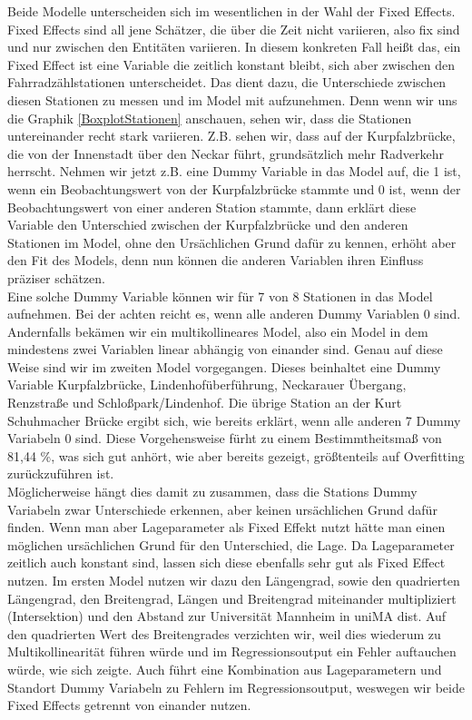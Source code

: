 \documentclass[a4paper,12pt]{thesis}
\begin{document}
Beide Modelle unterscheiden sich im wesentlichen in der Wahl der Fixed Effects. Fixed Effects sind all jene Schätzer, die über die Zeit nicht variieren, also fix sind und nur zwischen den Entitäten variieren. In diesem konkreten Fall heißt das, ein Fixed Effect ist eine Variable die zeitlich konstant bleibt, sich aber zwischen den Fahrradzählstationen unterscheidet. Das dient dazu, die Unterschiede zwischen diesen Stationen zu messen und im Model mit aufzunehmen. Denn wenn wir uns die Graphik \ref{BoxplotStationen} anschauen, sehen wir, dass die Stationen untereinander recht stark variieren. Z.B. sehen wir, dass auf der Kurpfalzbrücke, die von der Innenstadt über den Neckar führt, grundsätzlich mehr Radverkehr herrscht. Nehmen wir jetzt z.B. eine Dummy Variable in das Model auf, die 1 ist, wenn ein Beobachtungswert von der Kurpfalzbrücke stammte und 0 ist, wenn der Beobachtungswert von einer anderen Station stammte, dann erklärt diese Variable den Unterschied zwischen der Kurpfalzbrücke und den anderen Stationen im Model, ohne den Ursächlichen Grund dafür zu kennen, erhöht aber den Fit des Models, denn nun können die anderen Variablen ihren Einfluss präziser schätzen.\\ 

Eine solche Dummy Variable können wir für 7 von 8 Stationen in das Model aufnehmen. Bei der achten reicht es, wenn alle anderen Dummy Variablen 0 sind. Andernfalls bekämen wir ein multikollineares Model, also ein Model in dem mindestens zwei Variablen linear abhängig von einander sind. Genau auf diese Weise sind wir im zweiten Model vorgegangen. Dieses beinhaltet eine Dummy Variable Kurpfalzbrücke, Lindenhofüberführung, Neckarauer Übergang, Renzstraße und Schloßpark/Lindenhof. Die übrige Station an der Kurt Schuhmacher Brücke ergibt sich, wie bereits erklärt, wenn alle anderen 7 Dummy Variabeln 0 sind. Diese Vorgehensweise fürht zu einem Bestimmtheitsmaß von 81,44 \%, was sich gut anhört, wie aber bereits gezeigt, größtenteils auf Overfitting zurückzuführen ist.\\

Möglicherweise hängt dies damit zu zusammen, dass die Stations Dummy Variabeln zwar Unterschiede erkennen, aber keinen ursächlichen Grund dafür finden. Wenn man aber Lageparameter als Fixed Effekt nutzt hätte man einen möglichen ursächlichen Grund für den Unterschied, die Lage. Da Lageparameter zeitlich auch konstant sind, lassen sich diese ebenfalls sehr gut als Fixed Effect nutzen. Im ersten Model nutzen wir dazu den Längengrad, sowie den quadrierten Längengrad, den Breitengrad, Längen und Breitengrad miteinander multipliziert (Intersektion) und den Abstand zur Universität Mannheim in uniMA dist. Auf den quadrierten Wert des Breitengrades verzichten wir, weil dies wiederum zu Multikollinearität führen würde und im Regressionsoutput ein Fehler auftauchen würde, wie sich zeigte. Auch führt eine Kombination aus Lageparametern und Standort Dummy Variabeln zu Fehlern im Regressionsoutput, weswegen wir beide Fixed Effects getrennt von einander nutzen.\\
\end{document}
